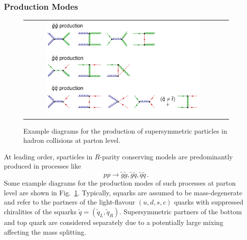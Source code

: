 \subsubsection*{Production Modes}
\label{subsubsec:susy_prod}
\begin{figure}[!tp]
  \centering 
  \begin{tabular}{cc}
    \includegraphics[width=0.8\textwidth]{figures/Susy_Feynman.jpg} 
  \end{tabular}
  \caption{Example diagrams for the production of supersymmetric particles in hadron collisions at parton level.}
  \label{fig:susy_feynman}
\end{figure}
At leading order, sparticles in $R$-parity conserving models are predominantly produced in processes like~\cite{Kane:1982hw, Harrison:1982yi, Reya:1984yz, Dawson:1983fw, Baer:1985xz}
\begin{equation}
 pp \rightarrow \tilde{g}\tilde{g}, \tilde{g}\tilde{q}, \tilde{q}\tilde{q} \, .
\end{equation}
Some example diagrams for the production modes of such processes at parton level are shown in Fig.~\ref{fig:susy_feynman}. Typically, squarks are assumed to be mass-degenerate and refer to the partners of the light-flavour $(u, d, s, c)$ quarks with suppressed chiralities of the squarks $\tilde{q} = (\tilde{q}_L, \tilde{q}_R)$. Supersymmetric partners of the bottom and top quark are considered separately due to a potentially large mixing affecting the mass splitting.
